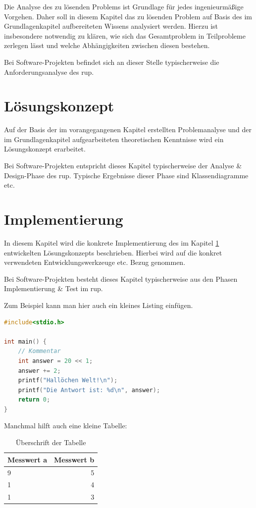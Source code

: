 \documentclass[oneside]{ausarbeitung}
\begin{document}
Die Analyse des zu lösenden Problems ist Grundlage für jedes 
ingenieurmäßige Vorgehen. Daher soll in diesem Kapitel das zu lösenden 
Problem auf Basis des im Grundlagenkapitel aufbereiteten Wissens 
analysiert werden. Hierzu ist insbesondere notwendig zu klären, wie sich 
das Gesamtproblem in Teilprobleme zerlegen lässt und welche 
Abhängigkeiten zwischen diesen bestehen.

Bei Software-Projekten befindet sich an dieser Stelle typischerweise die 
Anforderungsanalyse des \ac{rup}.

\chapter{Lösungskonzept}
\label{cha:loesungskonzept}

Auf der Basis der im vorangegangenen Kapitel erstellten Problemanalyse 
und der im Grundlagenkapitel aufgearbeiteten theoretischen Kenntnisse 
wird ein Lösungskonzept erarbeitet.

Bei Software-Projekten entspricht dieses Kapitel typischerweise der 
Analyse \& Design-Phase des \ac{rup}. Typische Ergebnisse dieser Phase sind 
Klassendiagramme etc.

\chapter{Implementierung}
\label{cha:implementierung}

In diesem Kapitel wird die konkrete Implementierung des im Kapitel
\ref{cha:loesungskonzept} entwickelten Lösungskonzepts beschrieben.
Hierbei wird auf die konkret verwendeten Entwicklungswerkzeuge etc. 
Bezug genommen.

Bei Software-Projekten besteht dieses Kapitel typischerweise aus den 
Phasen Implementierung \& Test im \ac{rup}.

Zum Beispiel kann man hier auch ein kleines Listing einfügen.

\begin{lstlisting}[language=c,%
                   caption={Überschrift des Quelltexts}]
#include<stdio.h>

int main() {
    // Kommentar
    int answer = 20 << 1;
    answer += 2;
    printf("Hallöchen Welt!\n");
    printf("Die Antwort ist: %d\n", answer);
    return 0;
}
\end{lstlisting}

Manchmal hilft auch eine kleine Tabelle:

\begin{table}[htbp]
\centering
\begin{tabular}{|l|r|}
\hline
\textbf{Messwert a} & \textbf{Messwert b} \\ \hline
9 & 5 \\ \hline
1 & 4 \\ \hline
1 & 3 \\ \hline
\end{tabular}
\caption{Überschrift der Tabelle}
\label{tab:my-table}
\end{table}
\end{document}
